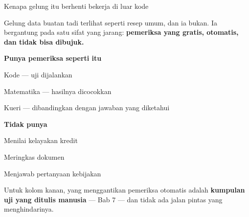 \documentclass[aspectratio=169,11pt,t]{beamer}
\begin{document}
\begin{frame}[shrink=25]{Kenapa gelung itu berhenti bekerja di luar kode}
{\fontsize{9.4}{12.6}\selectfont\color{fg2}Gelung data buatan tadi terlihat seperti resep umum, dan ia bukan. Ia bergantung pada satu sifat yang jarang: \textbf{pemeriksa yang gratis, otomatis, dan tidak bisa dibujuk.}\par}\vskip 4pt
\begin{minipage}[t]{0.485\textwidth}
{\fontsize{9.4}{12.6}\selectfont\color{fg2}\textbf{Punya pemeriksa seperti itu}\par}\vskip 4pt
\begin{ibullets}
\item Kode --- uji dijalankan
\item Matematika --- hasilnya dicocokkan
\item Kueri --- dibandingkan dengan jawaban yang diketahui
\end{ibullets}

\end{minipage}%
\hfill
\begin{minipage}[t]{0.485\textwidth}
{\fontsize{9.4}{12.6}\selectfont\color{fg2}\textbf{Tidak punya}\par}\vskip 4pt
\begin{ibullets}
\item Menilai kelayakan kredit
\item Meringkas dokumen
\item Menjawab pertanyaan kebijakan
\end{ibullets}

\end{minipage}%
\begin{iband}[signal]
Untuk kolom kanan, yang menggantikan pemeriksa otomatis adalah \textbf{kumpulan uji yang ditulis manusia} --- Bab 7 --- dan tidak ada jalan pintas yang menghindarinya.
\end{iband}
\end{frame}
\end{document}
